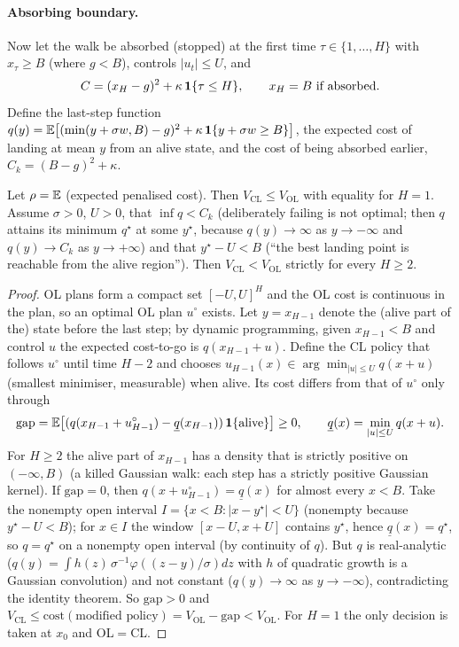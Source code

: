 \paragraph{Absorbing boundary.}
Now let the walk be absorbed (stopped) at the first time $\tau\in\{1,\dots,H\}$ with $x_\tau\ge B$ (where $g<B$), controls $|u_t|\le U$, and
\[
C=(x_H-g)^2+\kappa\,\mathbf 1\{\tau\le H\},\qquad x_H=B\ \text{if absorbed}.
\]
Define the last-step function $q(y)=\mathbb{E}\bigl[(\min(y+\sigma w,B)-g)^2+\kappa\,\mathbf 1\{y+\sigma w\ge B\}\bigr]$, the expected cost of landing at mean $y$ from an alive state, and the cost of being absorbed earlier, $C_k=(B-g)^2+\kappa$.

\begin{theorem}\label{thm:barrier}
Let $\rho=\mathbb{E}$ (expected penalised cost). Then $V_{\mathrm{CL}}\le V_{\mathrm{OL}}$ with equality for $H=1$. Assume $\sigma>0$, $U>0$, that $\inf q<C_k$ (deliberately failing is not optimal; then $q$ attains its minimum $q^\star$ at some $y^\star$, because $q(y)\to\infty$ as $y\to-\infty$ and $q(y)\to C_k$ as $y\to+\infty$) and that $y^\star-U<B$ (``the best landing point is reachable from the alive region''). Then $V_{\mathrm{CL}}<V_{\mathrm{OL}}$ strictly for every $H\ge2$.
\end{theorem}
\begin{proof}
OL plans form a compact set $[-U,U]^H$ and the OL cost is continuous in the plan, so an optimal OL plan $u^\circ$ exists. Let $y=x_{H-1}$ denote the (alive part of the) state before the last step; by dynamic programming, given $x_{H-1}<B$ and control $u$ the expected cost-to-go is $q(x_{H-1}+u)$.
Define the CL policy that follows $u^\circ$ until time $H-2$ and chooses $u_{H-1}(x)\in\arg\min_{|u|\le U}q(x+u)$ (smallest minimiser, measurable) when alive. Its cost differs from that of $u^\circ$ only through
\[
\mathrm{gap}=\mathbb{E}\bigl[(q(x_{H-1}+u^\circ_{H-1})-\underline q(x_{H-1}))\,\mathbf 1\{\text{alive}\}\bigr]\ge0,\qquad \underline q(x)=\min_{|u|\le U}q(x+u).
\]
For $H\ge2$ the alive part of $x_{H-1}$ has a density that is strictly positive on $(-\infty,B)$ (a killed Gaussian walk: each step has a strictly positive Gaussian kernel). If $\mathrm{gap}=0$, then $q(x+u^\circ_{H-1})=\underline q(x)$ for almost every $x<B$. Take the nonempty open interval $I=\{x<B:|x-y^\star|<U\}$ (nonempty because $y^\star-U<B$); for $x\in I$ the window $[x-U,x+U]$ contains $y^\star$, hence $\underline q(x)=q^\star$, so $q=q^\star$ on a nonempty open interval (by continuity of $q$). But $q$ is real-analytic ($q(y)=\int h(z)\,\sigma^{-1}\varphi((z-y)/\sigma)dz$ with $h$ of quadratic growth is a Gaussian convolution) and not constant ($q(y)\to\infty$ as $y\to-\infty$), contradicting the identity theorem. So $\mathrm{gap}>0$ and $V_{\mathrm{CL}}\le\mathrm{cost}(\text{modified policy})=V_{\mathrm{OL}}-\mathrm{gap}<V_{\mathrm{OL}}$.
For $H=1$ the only decision is taken at $x_0$ and OL${}=$CL. 
\end{proof}

